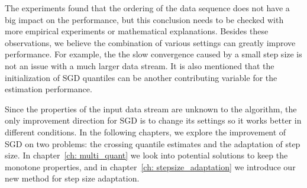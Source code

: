 The experiments found that the ordering of the data sequence does not have a big impact on the performance, but this conclusion needs to be checked with more empirical experiments or mathematical explanations.
Besides these observations, we believe the combination of various settings can greatly improve performance. For example, the the slow convergence caused by a small step size is not an issue with a much larger data stream. It is also mentioned that the initialization of SGD quantiles can be another contributing variable for the estimation performance. 

Since the properties of the input data stream are unknown to the algorithm, the only improvement direction for SGD is to change its settings so it works better in different conditions. In the following chapters, we explore the improvement of SGD on two problems: the crossing quantile estimates and the adaptation of step size. In chapter~\ref{ch: multi_quant} we look into potential solutions to keep the monotone properties, and in chapter~\ref{ch: stepsize_adaptation} we introduce our new method for step size adaptation.
% 
